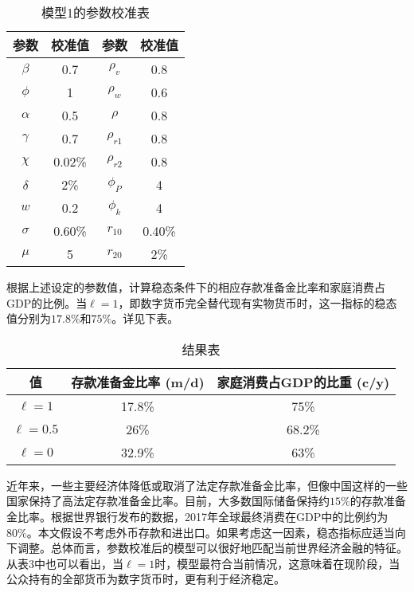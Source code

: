 \documentclass[withoutpreface,bwprint]{cumcmthesis} %
\begin{document}
\begin{table}[h]
	\centering
	\caption{模型1的参数校准表}
	\label{table:parameter_calibration_model_1}
	\begin{tabular}{cccc}
		\toprule[1.5pt]
		参数 & 校准值 & 参数 & 校准值 \\
		\midrule[1pt]
		$\beta$ & 0.7 & $\rho_v$ & 0.8 \\
		$\phi$ & 1 & $\rho_w$ & 0.6 \\
		$\alpha$ & 0.5 & $\rho$ & 0.8 \\
		$\gamma$ & 0.7 & $\rho_{r1}$ & 0.8 \\
		$\chi$ & 0.02\% & $\rho_{r2}$ & 0.8 \\
		$\delta$ & 2\% & $\phi_{P}$ & 4 \\
		$w$ & 0.2 & $\phi_{k}$ & 4 \\
		$\sigma$ & 0.60\% & $r_{10}$ & 0.40\% \\
		$\mu$ & 5 & $r_{20}$ & 2\% \\
		\bottomrule[1.5pt]
	\end{tabular}
\end{table}

根据上述设定的参数值，计算稳态条件下的相应存款准备金比率和家庭消费占GDP的比例。当$\ell = 1$，即数字货币完全替代现有实物货币时，这一指标的稳态值分别为$17.8\%$和$75\%$。详见下表\label{table:the_result1s}。

\begin{table}[h]
	\centering
	\caption{结果表}
	\label{table:the_results1}
	\begin{tabular}{ccc}
		\toprule[1.5pt]
		值 & 存款准备金比率 (m/d) & 家庭消费占GDP的比重 (c/y) \\
		\midrule[1pt]
		$\ell = 1$ & 17.8\% & 75\% \\
		$\ell = 0.5$ & 26\% & 68.2\% \\
		$\ell = 0$ & 32.9\% & 63\% \\
		\bottomrule[1.5pt]
	\end{tabular}
\end{table}


近年来，一些主要经济体降低或取消了法定存款准备金比率，但像中国这样的一些国家保持了高法定存款准备金比率。目前，大多数国际储备保持约$15\%$的存款准备金比率。根据世界银行发布的数据，2017年全球最终消费在GDP中的比例约为$80\%$。本文假设不考虑外币存款和进出口。如果考虑这一因素，稳态指标应适当向下调整。总体而言，参数校准后的模型可以很好地匹配当前世界经济金融的特征。从表3中也可以看出，当$\ell = 1$时，模型最符合当前情况，这意味着在现阶段，当公众持有的全部货币为数字货币时，更有利于经济稳定。
\end{document}

